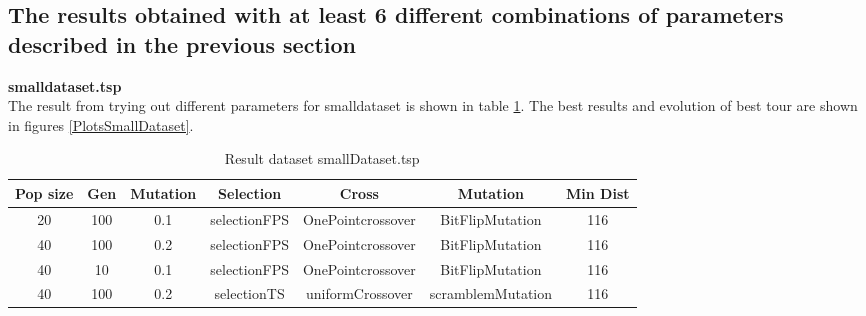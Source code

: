 \documentclass[12pt]{report}
\begin{document}
    \subsection{The results obtained with at least 6 different combinations of parameters
    described in the previous section}
    \textbf{smalldataset.tsp}\\
    The result from trying out different parameters for smalldataset is shown in table \ref{resultsSmallDataset}. The best results and evolution of best tour are shown in figures \ref{PlotsSmallDataset}.
    \begin{table}
        \centering
        \begin{tabular}{|c|c|c|c|c|c|c|}
            \hline
            Pop size & Gen & Mutation & Selection & Cross & Mutation & Min Dist\\
            \hline
            20 & 100 & 0.1 & selectionFPS & OnePointcrossover & BitFlipMutation & 116 \\
            \hline
            40 & 100 & 0.2 & selectionFPS & OnePointcrossover & BitFlipMutation & 116 \\
            \hline
            40 & 10 & 0.1 & selectionFPS & OnePointcrossover & BitFlipMutation & 116 \\
            \hline
            40 & 100 & 0.2 & selectionTS & uniformCrossover & scramblemMutation & 116 \\
            \hline
            \end{tabular}
        \caption{Result dataset smallDataset.tsp}
        \label{resultsSmallDataset}
    \end{table}
    
\end{document}
